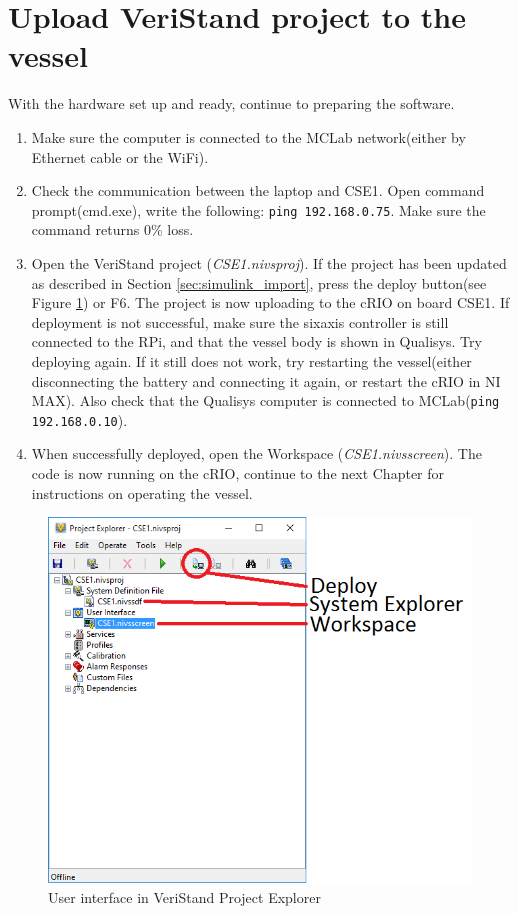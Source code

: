 \section{Upload VeriStand project to the vessel}
With the hardware set up and ready, continue to preparing the software. 
\begin{enumerate}
	\item Make sure the computer is connected to the MCLab network(either by Ethernet cable or the WiFi). 
	\item Check the communication between the laptop and CSE1. Open command prompt(cmd.exe), write the following: \texttt{ping 192.168.0.75}. Make sure the command returns 0\% loss.
	\item Open the VeriStand project (\textit{CSE1.nivsproj}). If the project has been updated as described in Section \ref{sec:simulink_import}, press the deploy button(see Figure \ref{fig:project_explorer}) or F6. The project is now uploading to the cRIO on board CSE1. If deployment is not successful, make sure the sixaxis controller is still connected to the RPi, and that the vessel body is shown in Qualisys. Try deploying again. If it still does not work, try restarting the vessel(either disconnecting the battery and connecting it again, or restart the cRIO in NI MAX). Also check that the Qualisys computer is connected to MCLab(\texttt{ping 192.168.0.10}). 
	\item When successfully deployed, open the Workspace (\textit{CSE1.nivsscreen}). The code is now running on the cRIO, continue to the next Chapter for instructions on operating the vessel. 
\end{enumerate}
\begin{figure}[htb!]
	\centering
	\includegraphics[scale=0.8]{fig/project_explorer.png}
	\caption{User interface in VeriStand Project Explorer}
	\label{fig:project_explorer}
\end{figure}
